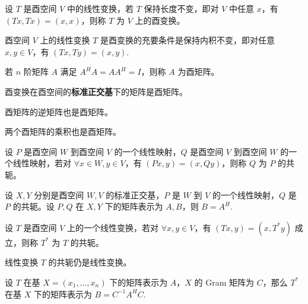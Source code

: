 \begin{definition}[酉变换]
设 $T$ 是酉空间 $V$ 中的线性变换，若 $T$ 保持长度不变，即对 $V$ 中任意 $x$，有 $(Tx,Tx)=(x,x)$，则称 $T$ 为 $V$ 上的酉变换。
\end{definition}

\begin{theorem}[酉变换的等价定义]
酉空间 $V$ 上的线性变换 $T$ 是酉变换的充要条件是保持内积不变，即对任意 $x,y\in V$，有 $(Tx,Ty)=(x,y)$.
\end{theorem}

\begin{definition}[酉矩阵]
若 $n$ 阶矩阵 $A$ 满足 $A^HA=AA^H=I$，则称 $A$ 为酉矩阵。
\end{definition}

\begin{theorem}[酉变换与酉矩阵]
酉变换在酉空间的\textbf{标准正交基}下的矩阵是酉矩阵。
\end{theorem}

\begin{property}
酉矩阵的逆矩阵也是酉矩阵。
\end{property}

\begin{property}
两个酉矩阵的乘积也是酉矩阵。
\end{property}

\begin{definition}[复线性映射的共轭]
设 $P$ 是酉空间 $W$ 到酉空间 $V$ 的一个线性映射，$Q$ 是酉空间
$V$ 到酉空间 $W$ 的一个线性映射，若对 $\forall x\in W,y\in V$，有 $(Px,y)=(x,Qy)$，则称 $Q$ 为 $P$ 的共轭。
\end{definition}

\begin{theorem}
设 $X,Y$ 分别是酉空间 $W,V$ 的标准正交基，$P$ 是 $W$ 到 $V$ 的一个线性映射，$Q$ 是 $P$ 的共轭。设 $P,Q$ 在 $X,Y$ 下的矩阵表示为 $A,B$，则 $B=A^H$.
\end{theorem}

\begin{definition}[复线性变换的共轭]
设 $T$ 是酉空间 $V$ 上的一个线性变换，若对 $\forall x,y\in V$，有 $(Tx,y)=(x,T^\ast y)$ 成立，则称 $T^\ast$ 为 $T$ 的共轭。
\end{definition}

\begin{property}
线性变换 $T$ 的共轭仍是线性变换。
\end{property}
\begin{theorem}
设 $T$ 在基 $X=(x_1,\ldots,x_n)$ 下的矩阵表示为 $A$，$X$ 的 Gram 矩阵为 $C$，那么 $T^\ast$ 在基 $X$ 下的矩阵表示为 $B=C^{-1}A^HC$.
\end{theorem}

